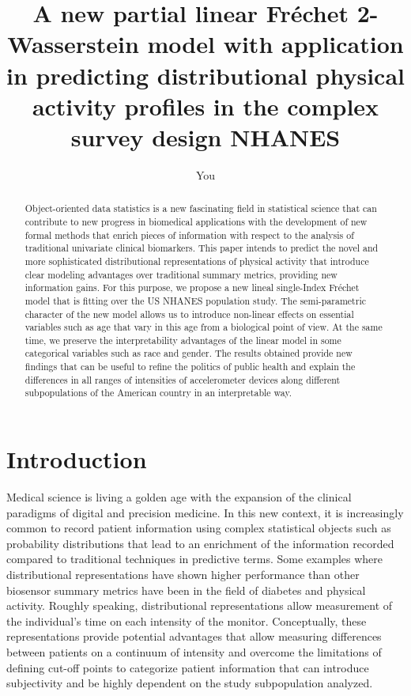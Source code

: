 \documentclass{article}
\title{A new partial linear Fréchet 2-Wasserstein  model with application in predicting distributional physical activity profiles in the complex survey design NHANES}
\author{You}
\begin{document}
\maketitle

\begin{abstract}

Object-oriented data statistics is a new fascinating field in statistical science that can contribute to new progress in biomedical applications with the development of new formal methods that enrich pieces of information with respect to the analysis of traditional univariate clinical biomarkers. This paper intends to predict the novel and more sophisticated distributional representations of physical activity that introduce clear modeling advantages over traditional summary metrics, providing new information gains. For this purpose, we propose a new lineal single-Index Fréchet model that is fitting over the  US NHANES population study.    The semi-parametric character of the new model allows us to introduce non-linear effects on essential variables such as age that vary in this age from a biological point of view. At the same time, we preserve the interpretability advantages of the linear model in some categorical variables such as race and gender. The results obtained provide new findings that can be useful to refine the politics of public health and explain the differences in all ranges of intensities of accelerometer devices along different subpopulations of the American country in an interpretable way. 




\end{abstract}


\section{Introduction}

Medical science is living a golden age with the expansion of the clinical paradigms of digital and precision medicine. In this new context, it is increasingly common to record patient information using complex statistical objects such as probability distributions that lead to an enrichment of the information recorded compared to traditional techniques in predictive terms. Some examples where distributional representations have shown higher performance than other biosensor summary metrics have been in the field of diabetes and physical activity. Roughly speaking, distributional representations allow measurement of the individual's time on each intensity of the monitor. Conceptually, these representations provide potential advantages that allow measuring differences between patients on a continuum of intensity and overcome the limitations of defining cut-off points to categorize patient information that can introduce subjectivity and be highly dependent on the study subpopulation analyzed.   
\end{document}

